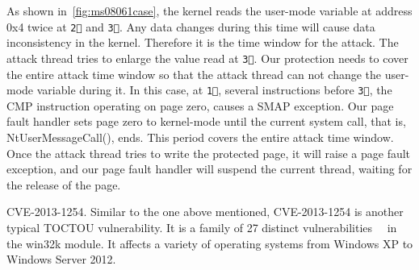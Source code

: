 As shown in~\autoref{fig:ms08061case}, the kernel reads the user-mode variable at address 0x4 twice at \texttt{\textcircled{2}} and \texttt{\textcircled{3}}. Any data changes during this time will cause data inconsistency in the kernel. Therefore it is the time window for the attack. The attack thread tries to enlarge the value read at \texttt{\textcircled{3}}. Our protection needs to cover the entire attack time window so that the attack thread can not change the user-mode variable during it. In this case, at \texttt{\textcircled{1}}, several instructions before \texttt{\textcircled{3}}, the CMP instruction operating on page zero, causes a SMAP exception. Our page fault handler sets page zero to kernel-mode until the current system call, that is, NtUserMessageCall(), ends. This period covers the entire attack time window. Once the attack thread tries to write the protected page, it will raise a page fault exception, and our page fault handler will suspend the current thread, waiting for the release of the page.





CVE-2013-1254. Similar to the one above mentioned, CVE-2013-1254 is another typical TOCTOU vulnerability. It is a family of 27 distinct vulnerabilities~\cite{ms13016}~\cite{jurczyk2013identifying} in the win32k module. It affects a variety of operating systems from Windows XP to Windows Server 2012.


